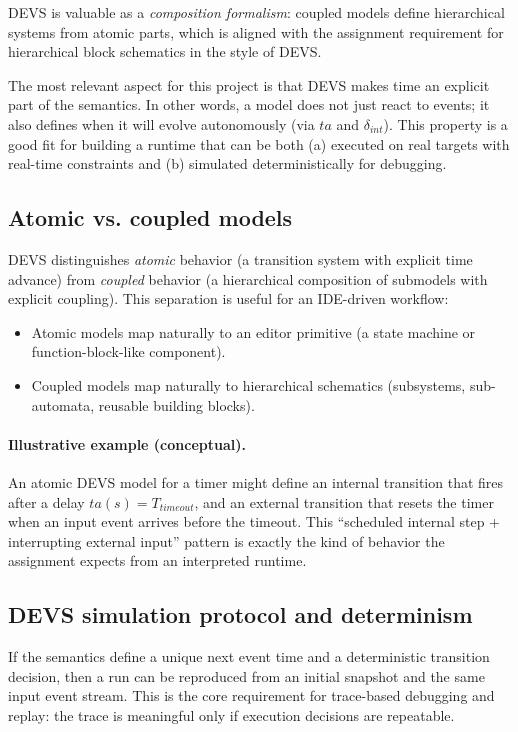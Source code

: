 DEVS is valuable as a \emph{composition formalism}: coupled models define hierarchical systems from atomic parts, which is aligned with the assignment requirement for hierarchical block schematics in the style of DEVS.

The most relevant aspect for this project is that DEVS makes time an explicit part of the semantics.
In other words, a model does not just react to events; it also defines when it will evolve autonomously (via $ta$ and $\delta_{int}$).
This property is a good fit for building a runtime that can be both (a) executed on real targets with real-time constraints and (b) simulated deterministically for debugging.

\subsection{Atomic vs. coupled models}

DEVS distinguishes \emph{atomic} behavior (a transition system with explicit time advance) from \emph{coupled} behavior (a hierarchical composition of submodels with explicit coupling).
This separation is useful for an IDE-driven workflow:
\begin{itemize}
  \item Atomic models map naturally to an editor primitive (a state machine or function-block-like component).
  \item Coupled models map naturally to hierarchical schematics (subsystems, sub-automata, reusable building blocks).
\end{itemize}

\paragraph{Illustrative example (conceptual).}
An atomic DEVS model for a timer might define an internal transition that fires after a delay $ta(s) = T_{timeout}$, and an external transition that resets the timer when an input event arrives before the timeout.
This ``scheduled internal step + interrupting external input'' pattern is exactly the kind of behavior the assignment expects from an interpreted runtime.

\subsection{DEVS simulation protocol and determinism}

If the semantics define a unique next event time and a deterministic transition decision, then a run can be reproduced from an initial snapshot and the same input event stream.
This is the core requirement for trace-based debugging and replay: the trace is meaningful only if execution decisions are repeatable.

